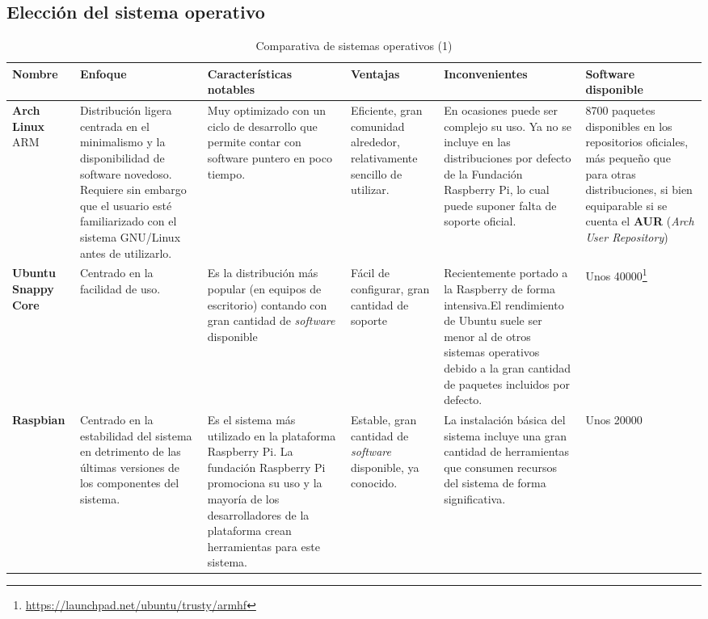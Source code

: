 
\begin{landscape}
\subsection{Elección del sistema operativo}
\label{os:evaluation}
\begin{table}[h]
\begin{tabular}{|p{1.6cm}|p{5cm}|p{4cm}|p{3cm}|p{4cm}|p{4cm}|}
\hline
\textbf{Nombre} & \textbf{Enfoque} & \textbf{Características notables} & \textbf{Ventajas} & \textbf{Inconvenientes} & \textbf{Software disponible}\\ \hline
\textbf{Arch Linux} ARM & Distribución ligera centrada en el minimalismo y la disponibilidad de software novedoso. Requiere sin embargo que el usuario esté familiarizado con el sistema GNU/Linux antes de utilizarlo. & Muy optimizado con un ciclo de desarrollo que permite contar con software puntero en poco tiempo. & Eficiente, gran comunidad alrededor, relativamente sencillo de utilizar. & En ocasiones puede ser complejo su uso. Ya no se incluye en las distribuciones por defecto de la Fundación Raspberry Pi, lo cual puede suponer falta de soporte oficial. & 8700 paquetes disponibles en los repositorios oficiales, más pequeño que para otras distribuciones, si bien equiparable si se cuenta el \textbf{AUR} (\textit{Arch User Repository})\\ \hline

\textbf{Ubuntu Snappy Core} & Centrado en la facilidad de uso. & Es la distribución más popular (en equipos de escritorio) contando con gran cantidad de \textit{software} disponible & Fácil de configurar, gran cantidad de soporte & Recientemente portado a la Raspberry de forma intensiva.El rendimiento de Ubuntu suele ser menor al de otros sistemas operativos debido a la gran cantidad de paquetes incluidos por defecto. & Unos 40000\footnote{\href{https://launchpad.net/ubuntu/trusty/armhf}{https://launchpad.net/ubuntu/trusty/armhf}}\\ \hline 

\textbf{Raspbian} & Centrado en la estabilidad del sistema en detrimento de las últimas versiones de los componentes del sistema. & Es el sistema más utilizado en la plataforma Raspberry Pi. La fundación Raspberry Pi promociona su uso y la mayoría de los desarrolladores de la plataforma crean herramientas para este sistema. & Estable, gran cantidad de \textit{software} disponible, ya conocido. & La instalación básica del sistema incluye una gran cantidad de herramientas que consumen recursos del sistema de forma significativa. & Unos 20000\\ \hline
\end{tabular}
\caption{Comparativa de sistemas operativos (1)}
\end{table}
\end{landscape}

